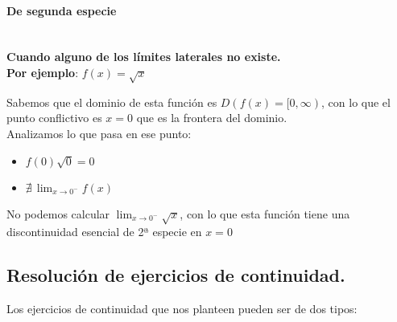 \documentclass[a4paper,11pt,answers]{exam}
\begin{document}
\paragraph{De segunda especie}\mbox{}\\
\textbf{Cuando alguno de los límites laterales no existe.}\\
\textbf{Por ejemplo}: $f(x) = \sqrt{x}$\\
\begin{solution}
Sabemos que el dominio de esta función es $D(f(x) = [0, \infty)$, con lo que el punto conflictivo es $x=0$ que es la frontera del dominio.\\
Analizamos lo que pasa en ese punto:
\begin{itemize}
	\item $f(0) \sqrt{0} = 0$
	\item $\nexists\,\lim_{x \to 0^-} f(x)$
\end{itemize}
\end{solution}
No podemos calcular $\lim_{x \to 0^-} \sqrt{x}$, con lo que esta función tiene una discontinuidad esencial de 2ª especie en $x=0$

\subsection{Resolución de ejercicios de continuidad.}
Los ejercicios de continuidad que nos planteen pueden ser de dos tipos:
\end{document}

